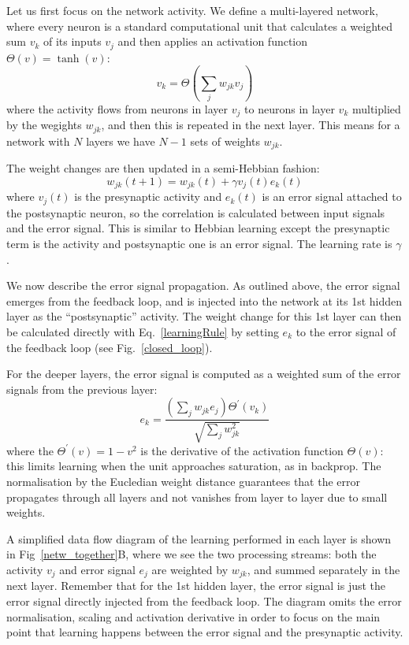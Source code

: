\documentclass{llncs}
\begin{document}
Let us first focus on the network activity. We
define a multi-layered network, where every neuron is a standard
computational unit that calculates a weighted sum $v_k$ of its inputs $v_j$ and
then applies an activation function $\Theta(v) = \tanh(v)$:
\begin{equation}
  v_k = \Theta\left( \sum_j w_{jk} v_{j} \right) \label{act_sum}
\end{equation}
where the activity flows from neurons in layer $v_j$ to neurons in
layer $v_k$ multiplied by the wegights $w_{jk}$, and then this
is repeated in the next layer. This means for a network with
$N$ layers we have $N-1$ sets of weights $w_{jk}$.

The weight changes are then updated in a semi-Hebbian fashion:
\begin{equation}
  w_{jk}(t+1) = w_{jk}(t) + \gamma v_j(t)  e_k(t) \label{learningRule}
\end{equation}
where $v_j(t)$ is the presynaptic activity and $e_k(t)$ is an error signal
attached to the postsynaptic neuron, so the correlation is
calculated between input signals and the error signal. This is
similar to Hebbian learning except the presynaptic term is the
activity and postsynaptic one is an error signal. The learning rate is $\gamma$.


We now describe the error signal propagation. As outlined above, the
error signal emerges from the feedback loop, and is injected into the
network at its 1st hidden layer as the ``postsynaptic'' activity. The
weight change for this 1st layer can then be calculated directly with
Eq.~\ref{learningRule} by setting $e_k$ to the error signal of the
feedback loop (see Fig.~\ref{closed_loop}).

For the deeper layers, the error signal is computed as a weighted
sum of the error signals from the previous layer:
\begin{equation}
  e_k = \frac{\left( \sum_j w_{jk} e_{j} \right) \Theta^\prime (v_k) }{\sqrt{\sum_j w_{jk}^2}}
\end{equation}
where the $\Theta^\prime (v) = 1 - v^2$ is the derivative of the activation
function $\Theta(v)$: this limits learning when the unit approaches saturation,
as in backprop. The normalisation by the Eucledian weight
distance guarantees that the error propagates through all layers and
not vanishes from layer to layer due to small weights.

A simplified data flow diagram of the learning performed in each layer
is shown in Fig~\ref{netw_together}B, where we see the two processing
streams: both the activity $v_j$ and error signal $e_j$ are
weighted by $w_{jk}$, and summed separately in the next layer.
Remember that for the 1st hidden layer, the error signal is just the
error signal directly injected from the feedback loop. The diagram omits the error
normalisation, scaling and activation derivative in order to focus on the main point that learning happens between the error signal and the
presynaptic activity.
\end{document}

